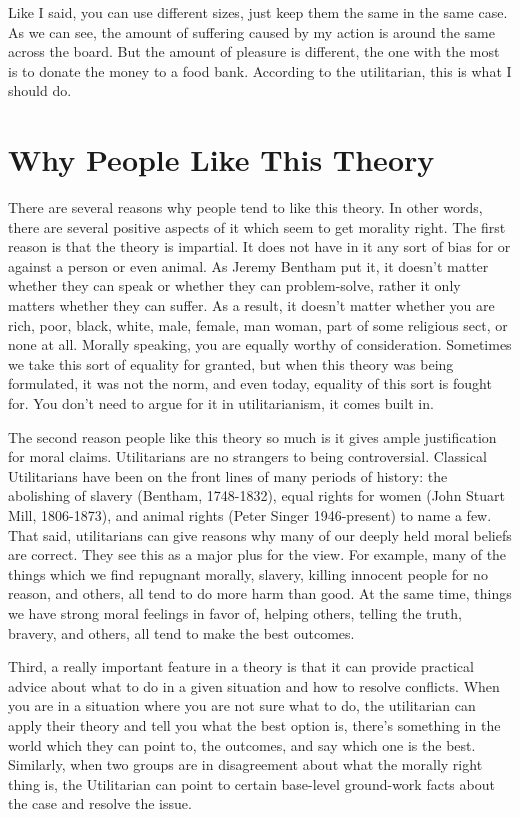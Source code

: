 Like I said, you can use different sizes, just keep them the same in the same case. As we can see, the amount of suffering caused by my action is around the same across the board. But the amount of pleasure is different, the one with the most is to donate the money to a food bank. According to the utilitarian, this is what I should do.
\section{Why People Like This Theory}

There are several reasons why people tend to like this theory. In other words, there are several positive aspects of it which seem to get morality right. The first reason is that the theory is impartial. It does not have in it any sort of bias for or against a person or even animal. As Jeremy Bentham put it, it doesn't matter whether they can speak or whether they can problem-solve, rather it only matters whether they can suffer. As a result, it doesn't matter whether you are rich, poor, black, white, male, female, man woman, part of some religious sect, or none at all. Morally speaking, you are equally worthy of consideration. Sometimes we take this sort of equality for granted, but when this theory was being formulated, it was not the norm, and even today, equality of this sort is fought for. You don’t need to argue for it in utilitarianism, it comes built in.

The second reason people like this theory so much is it gives ample justification for moral claims. Utilitarians are no strangers to being controversial. Classical Utilitarians have been on the front lines of many periods of history: the abolishing of slavery (Bentham, 1748-1832), equal rights for women (John Stuart Mill, 1806-1873), and animal rights (Peter Singer 1946-present) to name a few. That said, utilitarians can give reasons why many of our deeply held moral beliefs are correct. They see this as a major plus for the view. For example, many of the things which we find repugnant morally, slavery, killing innocent people for no reason, and others, all tend to do more harm than good. At the same time, things we have strong moral feelings in favor of, helping others, telling the truth, bravery, and others, all tend to make the best outcomes.

Third, a really important feature in a theory is that it can provide practical advice about what to do in a given situation and how to resolve conflicts. When you are in a situation where you are not sure what to do, the utilitarian can apply their theory and tell you what the best option is, there’s something in the world which they can point to, the outcomes, and say which one is the best. Similarly, when two groups are in disagreement about what the morally right thing is, the Utilitarian can point to certain base-level ground-work facts about the case and resolve the issue.

